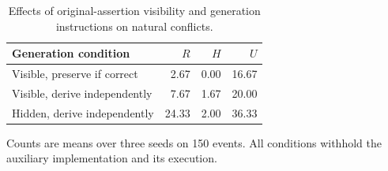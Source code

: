 \begin{table}[t]
\centering
\small
\caption{Effects of original-assertion visibility and generation instructions on natural conflicts.}
\label{tab:anchoring}
\begin{tabular}{lrrr}
\toprule
Generation condition & $R$ & $H$ & $U$ \\
\midrule
Visible, preserve if correct & 2.67 & 0.00 & 16.67 \\
Visible, derive independently & 7.67 & 1.67 & 20.00 \\
Hidden, derive independently & 24.33 & 2.00 & 36.33 \\
\bottomrule
\end{tabular}
\par\smallskip
\begin{minipage}{\linewidth}
\footnotesize
Counts are means over three seeds on 150 events. All conditions withhold the auxiliary implementation and its execution.
\end{minipage}
\end{table}
